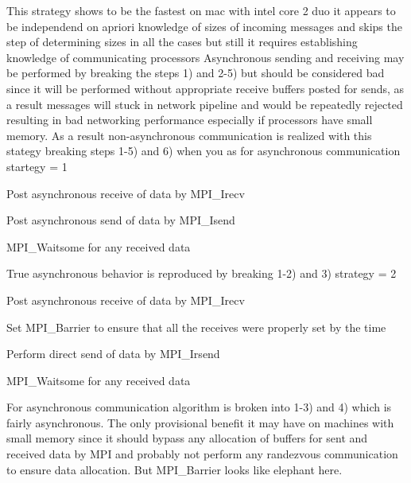 This strategy shows to be the fastest on mac with intel core 2 duo it appears to be independend on apriori knowledge of sizes of incoming messages and skips the step of determining sizes in all the cases but still it requires establishing knowledge of communicating processors Asynchronous sending and receiving may be performed by breaking the steps 1) and 2-\/5) but should be considered bad since it will be performed without appropriate receive buffers posted for sends, as a result messages will stuck in network pipeline and would be repeatedly rejected resulting in bad networking performance especially if processors have small memory. As a result non-\/asynchronous communication is realized with this stategy breaking steps 1-\/5) and 6) when you as for asynchronous communication startegy = 1
\begin{DoxyEnumerate}
\item Post asynchronous receive of data by M\-P\-I\-\_\-\-Irecv
\item Post asynchronous send of data by M\-P\-I\-\_\-\-Isend
\item M\-P\-I\-\_\-\-Waitsome for any received data
\end{DoxyEnumerate}

True asynchronous behavior is reproduced by breaking 1-\/2) and 3) strategy = 2
\begin{DoxyEnumerate}
\item Post asynchronous receive of data by M\-P\-I\-\_\-\-Irecv
\item Set M\-P\-I\-\_\-\-Barrier to ensure that all the receives were properly set by the time
\end{DoxyEnumerate}
\begin{DoxyEnumerate}
\item Perform direct send of data by M\-P\-I\-\_\-\-Irsend
\item M\-P\-I\-\_\-\-Waitsome for any received data
\end{DoxyEnumerate}

For asynchronous communication algorithm is broken into 1-\/3) and 4) which is fairly asynchronous. The only provisional benefit it may have on machines with small memory since it should bypass any allocation of buffers for sent and received data by M\-P\-I and probably not perform any randezvous communication to ensure data allocation. But M\-P\-I\-\_\-\-Barrier looks like elephant here.

